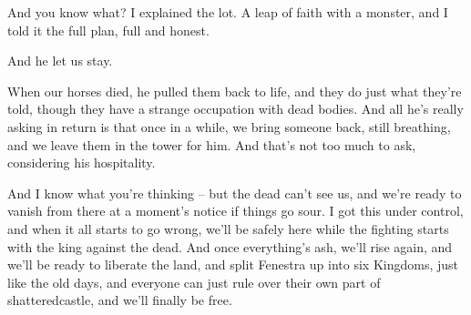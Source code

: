 \begin{speechtext}
	And you know what?  I explained the lot.  A leap of faith with a monster, and I told it the full plan, full and honest.

	And he let us stay.

	When our horses died, he pulled them back to life, and they do just what they're told, though they have a strange occupation with dead bodies.  And all he's really asking in return is that once in a while, we bring someone back, still breathing, and we leave them in the tower for him.  And that's not too much to ask, considering his hospitality.

	And I know what you're thinking -- but the dead can't see us, and we're ready to vanish from there at a moment's notice if things go sour.  I got this under control, and when it all starts to go wrong, we'll be safely here while the fighting starts with the king against the dead.  And once everything's ash, we'll rise again, and we'll be ready to liberate the land, and split Fenestra up into six Kingdoms, just like the old days, and everyone can just rule over their own part of \gls{shatteredcastle}, and we'll finally be free.

\end{speechtext}




